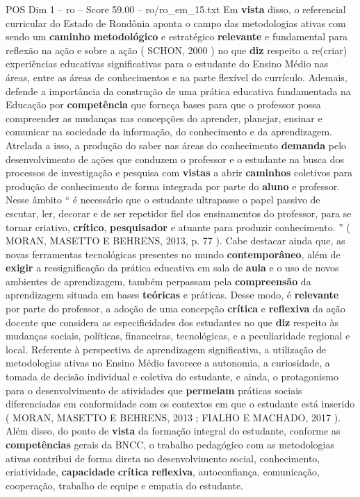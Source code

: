\begin{textsample}{POS Dim 1 – ro – Score 59.00 – ro/ro\_em\_15.txt}
Em \textbf{vista} disso, o referencial curricular do Estado de Rondônia aponta o campo das metodologias ativas com sendo um \textbf{caminho} \textbf{metodológico} e estratégico \textbf{relevante} e fundamental para reflexão na ação e sobre a ação ( SCHON, 2000 ) no que \textbf{diz} respeito a re(criar) experiências educativas significativas para o estudante do Ensino Médio nas áreas, entre as áreas de conhecimentos e na parte flexível do currículo.
Ademais, defende a importância da construção de uma prática educativa fundamentada na Educação por \textbf{competência} que forneça bases para que o professor possa compreender as mudanças nas concepções do aprender, planejar, ensinar e comunicar na sociedade da informação, do conhecimento e da aprendizagem.
Atrelada a isso, a produção do saber nas áreas do conhecimento \textbf{demanda} pelo desenvolvimento de ações que conduzem o professor e o estudante na busca dos processos de investigação e pesquisa com \textbf{vistas} a abrir \textbf{caminhos} coletivos para produção de conhecimento de forma integrada por parte do \textbf{aluno} e professor.
Nesse âmbito “ é necessário que o estudante ultrapasse o papel passivo de escutar, ler, decorar e de ser repetidor fiel dos ensinamentos do professor, para se tornar criativo, \textbf{crítico}, \textbf{pesquisador} e atuante para produzir conhecimento. ” ( MORAN, MASETTO E BEHRENS, 2013, p. 77 ).
Cabe destacar ainda que, as novas ferramentas tecnológicas presentes no mundo \textbf{contemporâneo}, além de \textbf{exigir} a ressignificação da prática educativa em sala de \textbf{aula} e o uso de novos ambientes de aprendizagem, também perpassam pela \textbf{compreensão} da aprendizagem situada em bases \textbf{teóricas} e práticas.
Desse modo, é \textbf{relevante} por parte do professor, a adoção de uma concepção \textbf{crítica} e \textbf{reflexiva} da ação docente que considera as especificidades dos estudantes no que \textbf{diz} respeito às mudanças sociais, políticas, financeiras, tecnológicas, e a peculiaridade regional e local.
Referente à perspectiva de aprendizagem significativa, a utilização de metodologias ativas no Ensino Médio favorece a autonomia, a curiosidade, a tomada de decisão individual e coletiva do estudante, e ainda, o protagonismo para o desenvolvimento de atividades que \textbf{permeiam} práticas sociais diferenciadas em conformidade com os contextos em que o estudante está inserido ( MORAN, MASETTO E BEHRENS, 2013 ; FIALHO E MACHADO, 2017 ).
Além disso, do ponto de \textbf{vista} da formação integral do estudante, conforme as \textbf{competências} gerais da BNCC, o trabalho pedagógico com as metodologias ativas contribui de forma direta no desenvolvimento social, conhecimento, criatividade, \textbf{capacidade} \textbf{crítica} \textbf{reflexiva}, autoconfiança, comunicação, cooperação, trabalho de equipe e empatia do estudante.

\end{textsample}
